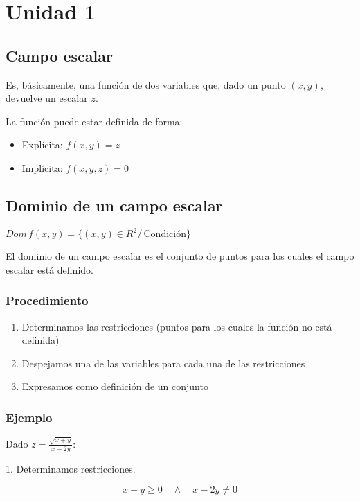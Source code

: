 \section{Unidad 1}

\subsection{Campo escalar}

Es, básicamente, una función de dos variables que,
dado un punto \((x,y)\),
devuelve un escalar \(z\).

La función puede estar definida de forma:
\begin{itemize}
    \item Explícita: \(f(x,y) = z\)
    \item Implícita: \(f(x,y,z) = 0\)
\end{itemize}

\subsection{Dominio de un campo escalar}

\(Dom \, f(x,y) = \{(x,y) \in R^{2} / \, \text{Condición}\}\)

El dominio de un campo escalar es el conjunto de puntos para los cuales el campo
escalar está definido.

\subsubsection{Procedimiento}

\begin{enumerate}
    \item Determinamos las restricciones (puntos para los cuales la función
          no está definida)
    \item Despejamos una de las variables para cada una de las restricciones
    \item Expresamos como definición de un conjunto
\end{enumerate}

\subsubsection{Ejemplo}

Dado \(z = \frac{\sqrt{x+y}}{x-2y}\):

1. Determinamos restricciones.

\begin{equation*}
    x+y \geq 0 \quad \land \quad x-2y \neq 0
\end{equation*}

